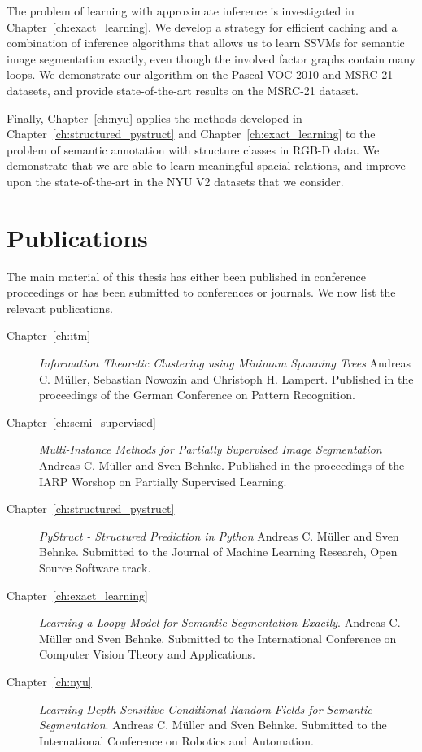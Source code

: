 The problem of learning with approximate inference is investigated in
Chapter~\ref{ch:exact_learning}.  We develop a strategy for efficient caching
and a combination of inference algorithms that allows us to learn SSVMs for
semantic image segmentation exactly, even though the involved factor graphs
contain many loops. We demonstrate our algorithm on the Pascal VOC 2010 and MSRC-21 datasets,
and provide state-of-the-art results on the MSRC-21 dataset.

Finally, Chapter~\ref{ch:nyu} applies the methods developed in
Chapter~\ref{ch:structured_pystruct} and Chapter~\ref{ch:exact_learning} to the
problem of semantic annotation with structure classes in RGB-D data. We
demonstrate that we are able to learn meaningful spacial relations, and improve
upon the state-of-the-art in the NYU V2 datasets that we consider.

\section{Publications}
The main material of this thesis has either been published in conference
proceedings or has been submitted to conferences or journals. We now list the
relevant publications.
\begin{description}
    \item[Chapter~\ref{ch:itm}] \emph{Information Theoretic Clustering using Minimum Spanning Trees} Andreas C. M\"uller, Sebastian Nowozin and Christoph H. Lampert. Published in the proceedings of the German Conference on Pattern Recognition.
    \item[Chapter~\ref{ch:semi_supervised}] \emph{Multi-Instance Methods for Partially Supervised Image Segmentation} Andreas C. M\"uller and Sven Behnke. Published in the proceedings of the IARP Worshop on Partially Supervised Learning.
    \item[Chapter~\ref{ch:structured_pystruct}] \emph{PyStruct - Structured Prediction in Python} Andreas C. M\"uller and Sven Behnke. Submitted to the Journal of Machine Learning Research, Open Source Software track.
    \item[Chapter~\ref{ch:exact_learning}] \emph{Learning a Loopy Model for Semantic Segmentation Exactly}. Andreas C. M\"uller and Sven Behnke. Submitted to the International Conference on Computer Vision Theory and Applications.
    \item[Chapter~\ref{ch:nyu}] \emph{Learning Depth-Sensitive Conditional Random Fields for Semantic Segmentation}. Andreas C. M\"uller and Sven Behnke. Submitted to the International Conference on Robotics and Automation.
\end{description}
